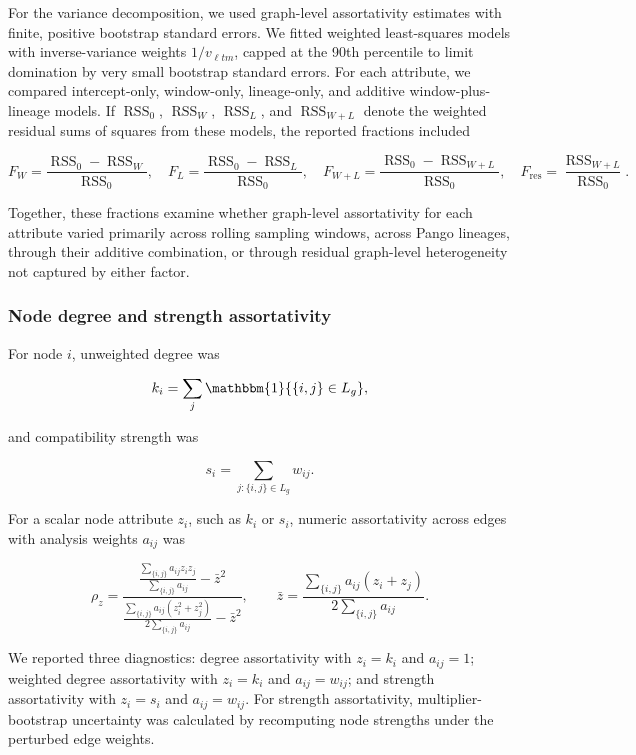 For the variance decomposition, we used graph-level assortativity estimates with finite, positive bootstrap standard errors. We fitted weighted least-squares models with inverse-variance weights $1/v_{\ell tm}$, capped at the 90th percentile to limit domination by very small bootstrap standard errors. For each attribute, we compared intercept-only, window-only, lineage-only, and additive window-plus-lineage models. If $\operatorname{RSS}_0$, $\operatorname{RSS}_W$, $\operatorname{RSS}_L$, and $\operatorname{RSS}_{W+L}$ denote the weighted residual sums of squares from these models, the reported fractions included

\[
	F_W=\frac{\operatorname{RSS}_0-\operatorname{RSS}_W}{\operatorname{RSS}_0},
	\quad
	F_L=\frac{\operatorname{RSS}_0-\operatorname{RSS}_L}{\operatorname{RSS}_0},
	\quad
	F_{W+L}=\frac{\operatorname{RSS}_0-\operatorname{RSS}_{W+L}}{\operatorname{RSS}_0},
	\quad
	F_{\mathrm{res}}=\frac{\operatorname{RSS}_{W+L}}{\operatorname{RSS}_0}.
\]

Together, these fractions examine whether graph-level assortativity for each attribute varied primarily across rolling sampling windows, across Pango lineages, through their additive combination, or through residual graph-level heterogeneity not captured by either factor.

\subsubsection{Node degree and strength assortativity}

For node $i$, unweighted degree was

\[
	k_i=\sum_{j}\mathbbm{1}\{\{i,j\}\in L_g\},
\]

and compatibility strength was

\[
	s_i=\sum_{j:\{i,j\}\in L_g} w_{ij}.
\]

For a scalar node attribute $z_i$, such as $k_i$ or $s_i$, numeric assortativity across edges with analysis weights $a_{ij}$ was

\[
	\rho_z
	=
	\frac{
		\frac{\sum_{\{i,j\}} a_{ij}z_i z_j}{\sum_{\{i,j\}} a_{ij}}
		-
		\bar z^2
	}{
		\frac{\sum_{\{i,j\}} a_{ij}(z_i^2+z_j^2)}{2\sum_{\{i,j\}} a_{ij}}
		-
		\bar z^2
	},
	\qquad
	\bar z=
	\frac{\sum_{\{i,j\}} a_{ij}(z_i+z_j)}{2\sum_{\{i,j\}} a_{ij}}.
\]

We reported three diagnostics: degree assortativity with $z_i=k_i$ and $a_{ij}=1$; weighted degree assortativity with $z_i=k_i$ and $a_{ij}=w_{ij}$; and strength assortativity with $z_i=s_i$ and $a_{ij}=w_{ij}$. For strength assortativity, multiplier-bootstrap uncertainty was calculated by recomputing node strengths under the perturbed edge weights.

